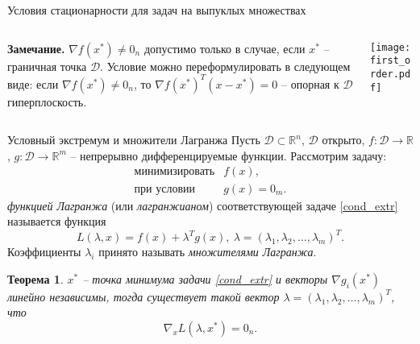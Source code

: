 \documentclass[10pt]{beamer}
\newtheorem{theorem_ru}{Теорема}[]
\begin{document}
\begin{frame}{Условия стационарности для задач на выпуклых множествах}
\begin{columns}
\begin{column}{.6\textwidth}
\textbf{Замечание.} $\nabla f(x^*)\neq 0_n$ допустимо только в случае, если $x^*$ -- граничная точка $\mathcal{D}$. Условие можно переформулировать в следующем виде: если $\nabla f(x^*)\neq 0_n$, то $\nabla f(x^*)^T(x-x^*)=0$ -- опорная к $\mathcal{D}$ гиперплоскость. 
\end{column}
\begin{column}{.4\textwidth}
\texttt{[image: first\_order.pdf]}
\end{column}
\end{columns}
\end{frame}

\begin{frame}{Условный экстремум и множители Лагранжа}
Пусть $\mathcal{D}\subset \mathbb{R}^n$, $\mathcal{D}$ открыто, $f:\mathcal{D}\rightarrow \mathbb{R}$, $g:\mathcal{D}\rightarrow \mathbb{R}^m$ -- непрерывно дифференцируемые функции. Рассмотрим задачу:
\begin{equation}\label{cond_extr}
\begin{array}{ll}
\mbox{минимизировать} &f(x),\\
\mbox{при условии}    &g(x)=0_m.
\end{array}
\end{equation}
\textit{функцией Лагранжа} (или \textit{лагранжианом}) соответствующей задаче \eqref{cond_extr} называется функция
$$
L(\lambda, x)=f(x)+\lambda^T g(x),~\lambda=(\lambda_1, \lambda_2, \ldots, \lambda_m)^T.
$$
Коэффициенты $\lambda_i$ принято называть \textit{множителями Лагранжа}.
\begin{theorem_ru}
$x^*$ -- точка минимума задачи \eqref{cond_extr} и векторы $\nabla g_i (x^*)$ линейно независимы, тогда существует такой вектор $\lambda=(\lambda_1, \lambda_2, \ldots, \lambda_m)^T$, что
$$
\nabla_x L(\lambda, x^*)=0_n.
$$
\end{theorem_ru}

\end{frame}
\end{document}
